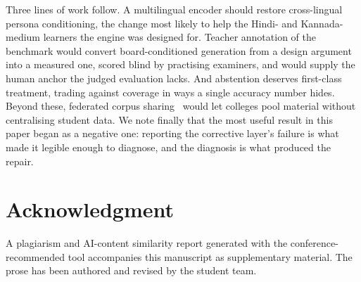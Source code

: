 \documentclass[conference]{IEEEtran}
\begin{document}
Three lines of work follow. A multilingual encoder should restore cross-lingual
persona conditioning, the change most likely to help the Hindi- and
Kannada-medium learners the engine was designed for. Teacher annotation of the
benchmark would convert board-conditioned generation from a design argument into
a measured one, scored blind by practising examiners, and would supply the human
anchor the judged evaluation lacks. And abstention deserves first-class
treatment, trading against coverage in ways a single accuracy number hides.
Beyond these, federated corpus sharing~\cite{fajardo2025} would let colleges
pool material without centralising student data. We note finally that the most
useful result in this paper began as a negative one: reporting the corrective
layer's failure is what made it legible enough to diagnose, and the diagnosis is
what produced the repair.

\section*{Acknowledgment}
A plagiarism and AI-content similarity report generated with the
conference-recommended tool accompanies this manuscript as supplementary
material. The prose has been authored and revised by the student team.
\end{document}
